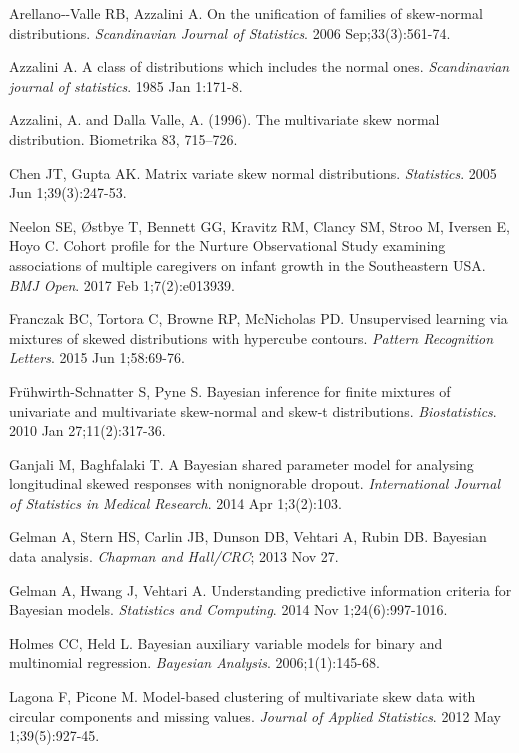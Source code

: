 \documentclass[useAMS,referee]{biom}
\begin{document}
\begin{thebibliography}{}

\bibitem{ } Arellano‐-Valle RB, Azzalini A. On the unification of families of skew‐normal distributions. \textit{Scandinavian Journal of Statistics}. 2006 Sep;33(3):561-74.

\bibitem{ } Azzalini A. A class of distributions which includes the normal ones. \textit{Scandinavian journal of statistics}. 1985 Jan 1:171-8.

\bibitem{ } Azzalini, A. and Dalla Valle, A. (1996). The multivariate skew normal distribution. Biometrika 83, 715–726.

\bibitem{ } Chen JT, Gupta AK. Matrix variate skew normal distributions. \textit{Statistics}. 2005 Jun 1;39(3):247-53.

\bibitem{ } Neelon SE, \O stbye T, Bennett GG, Kravitz RM, Clancy SM, Stroo M, Iversen E, Hoyo C. Cohort profile for the Nurture Observational Study examining associations of multiple caregivers on infant growth in the Southeastern USA. \textit{BMJ Open}. 2017 Feb 1;7(2):e013939.

\bibitem{ } Franczak BC, Tortora C, Browne RP, McNicholas PD. Unsupervised learning via mixtures of skewed distributions with hypercube contours. \textit{Pattern Recognition Letters}. 2015 Jun 1;58:69-76.

\bibitem{ } Fr\"{u}hwirth-Schnatter S, Pyne S. Bayesian inference for finite mixtures of univariate and multivariate skew-normal and skew-t distributions. \textit{Biostatistics}. 2010 Jan 27;11(2):317-36.

\bibitem{ } Ganjali M, Baghfalaki T. A Bayesian shared parameter model for analysing longitudinal skewed responses with nonignorable dropout. \textit{International Journal of Statistics in Medical Research}. 2014 Apr 1;3(2):103.

\bibitem{ } Gelman A, Stern HS, Carlin JB, Dunson DB, Vehtari A, Rubin DB. Bayesian data analysis. \textit{Chapman and Hall/CRC}; 2013 Nov 27.

\bibitem{ } Gelman A, Hwang J, Vehtari A. Understanding predictive information criteria for Bayesian models. \textit{Statistics and Computing}. 2014 Nov 1;24(6):997-1016.

\bibitem{ } Holmes CC, Held L. Bayesian auxiliary variable models for binary and multinomial regression. \textit{Bayesian Analysis}. 2006;1(1):145-68.

\bibitem{ } Lagona F, Picone M. Model-based clustering of multivariate skew data with circular components and missing values. \textit{Journal of Applied Statistics}. 2012 May 1;39(5):927-45.


\end{thebibliography}
\end{document}
